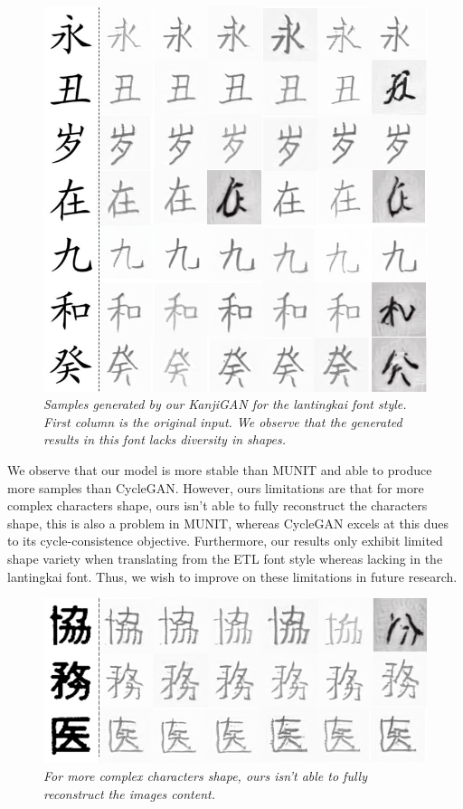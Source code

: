 \documentclass[12pt]{report}
\begin{document}
\begin{figure}[H]
	\centering
	\includegraphics[scale=0.8]{kanji-gan-results-3}
	\caption{\textit{Samples generated by our KanjiGAN for the lantingkai font style. First column is the original input. We observe that the generated results in this font lacks diversity in shapes.}}
	\label{fig:kanji-gan-results-3}
\end{figure}

We observe that our model is more stable than MUNIT and able to produce more samples than CycleGAN. However, ours limitations are that for more complex characters shape, ours isn't able to fully reconstruct the characters shape, this is also a problem in MUNIT, whereas CycleGAN excels at this dues to its cycle-consistence objective. Furthermore, our results only exhibit limited shape variety when translating from the ETL font style whereas lacking in the lantingkai font. Thus, we wish to improve on these limitations in future research.

\begin{figure}[H]
	\centering
	\includegraphics[scale=0.8]{kanji-gan-results-4}
	\caption{\textit{For more complex characters shape, ours isn't able to fully reconstruct the images content.}}
	\label{fig:kanji-gan-results-4}
\end{figure}
\end{document}
